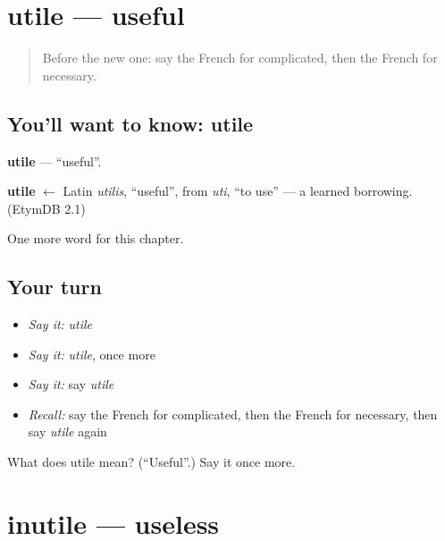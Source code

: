\section[utile]{utile — useful}

\label{lesson:FR-C191-utile}



\begin{quote}
Before the new one: say the French for complicated, then the French for necessary.
\end{quote}

\subsection*{You'll want to know: utile}
\textbf{utile} — \textquotedblleft{}useful\textquotedblright{}.

\begin{cousinweb}
\textbf{utile} $\leftarrow$ Latin \emph{utilis}, \textquotedblleft{}useful\textquotedblright{}, from \emph{uti}, \textquotedblleft{}to use\textquotedblright{} — a learned borrowing. (EtymDB 2.1)
\end{cousinweb}

\begin{grammarlens}[title={What you've built}]
One more word for this chapter.
\end{grammarlens}

\subsection*{Your turn}
\begin{itemize}
\raggedright
  \item \emph{Say it:} \emph{utile}
  \item \emph{Say it:} \emph{utile}, once more
  \item \emph{Say it:} say \emph{utile}
  \item \emph{Recall:} say the French for complicated, then the French for necessary, then say \emph{utile} again
\end{itemize}

\begin{tcolorbox}[breakable,colback=teal!4,colframe=teal!35!black,title={Before you move on}]
What does utile mean? (\textquotedblleft{}Useful\textquotedblright{}.) Say it once more.
\end{tcolorbox}
\section[inutile]{inutile — useless}

